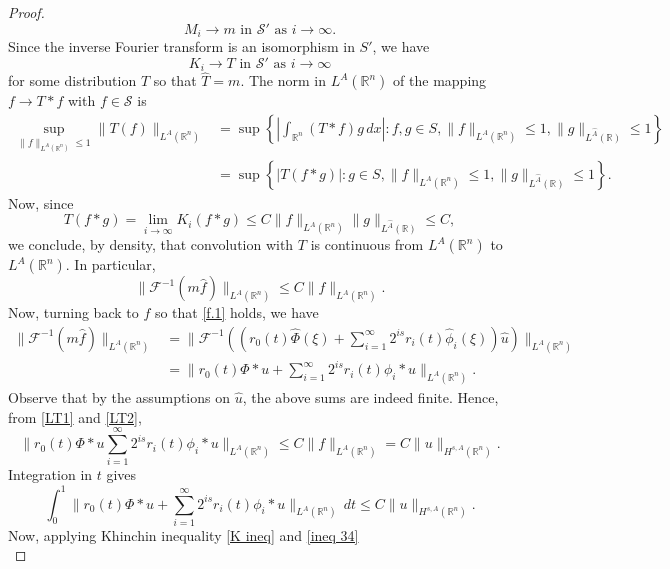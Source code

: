 \documentclass[leqno,twoside, 12pt]{amsart}
\theoremstyle{plain}
\numberwithin{equation}{section} \numberwithin{figure}{section}
\theoremstyle{definition}
\newcommand{\R}{\mathbb R}
\numberwithin{equation}{section}
\begin{document}
\begin{proof}
$$M_i \to m \text{ in }\mathcal{S}' \text{ as }i\to \infty.$$Since the inverse Fourier transform is an isomorphism in $S'$, we have
$$K_i \to T\text{ in $\mathcal{S}'$ as }i\to \infty$$for some distribution $T$ so that $\hat T=m$. The norm in $L^A(\R^n)$ of the mapping $f \to T* f$ with $f\in \mathcal{S}$ is
\begin{equation*}
\begin{split}
\sup_{\|f\|_{L^A(\R^n)}\leq 1}\|T(f)\|_{L^A(\R^n)} &= \sup\left\lbrace \left|\int_{\R^n}(T*f)g \,dx\right|: f, g\in S,\|f\|_{L^A(\R^n)}\leq 1, \|g\|_{L^{\hat A}(\R)}\leq 1 \right\rbrace\\& =\sup\left\lbrace \left|T(f*g)\right|: g\in S,\|f\|_{L^A(\R^n)}\leq 1, \|g\|_{L^{\hat A}(\R)}\leq 1 \right\rbrace.
\end{split}
\end{equation*}Now, since
$$T(f*g)=\lim_{i\to \infty}K_i(f*g)\leq C\|f\|_{L^A(\R^n)}\|g\|_{L^{\hat A}(\R)}\leq C,$$we conclude, by density, that convolution with $T$ is continuous from $L^A(\R^n)$ to $L^A(\R^n)$. In particular,
\begin{equation}\label{LT1}
\|\mathcal{F}^{-1}(m\hat{f})\|_{L^A(\R^n)}\leq C\|f\|_{L^A(\R^n)}.
\end{equation}Now, turning back to $f$ so that \eqref{f.1} holds, we have
\begin{equation}\label{LT2}
\begin{split}
\|\mathcal{F}^{-1}(m\hat{f})\|_{L^A(\R^n)}&=\bigg\|\mathcal{F}^{-1}\left(\left(r_0(t)\hat \Phi(\xi)+\sum_{i=1}^\infty 2^{is}r_i(t)\hat \phi_i(\xi)\right)\hat{u}\right)\bigg\|_{L^A(\R^n)}\\ & = \bigg\| r_0(t)\Phi*u+\sum_{i=1}^\infty 2^{is}r_i(t)\phi_i*u\bigg\|_{L^A(\R^n)}.
\end{split}
\end{equation}Observe that by the assumptions on $\hat u$, the above sums are indeed finite. Hence, from \eqref{LT1} and \eqref{LT2},
\begin{equation}\label{ineq norms}
\bigg\| r_0(t)\Phi*u\sum_{i=1}^\infty 2^{is}r_i(t)\phi_i*u\bigg\|_{L^A(\R^n)} \leq C\|f\|_{L^A(\R^n)} = C\|u\|_{H^{s, A}(\R^n)}.
\end{equation}Integration in $t$ gives
\begin{equation}\label{ineq 34}
\int_{0}^1\bigg\| r_0(t)\Phi*u+\sum_{i=1}^\infty 2^{is}r_i(t)\phi_i*u\bigg\|_{L^A(\R^n)}\,dt \leq  C\|u\|_{H^{s, A}(\R^n)}.
\end{equation}Now, applying Khinchin inequality \eqref{K ineq} and \eqref{ineq 34}
\begin{equation}\label{end first part}

\end{equation}
\end{proof}
\end{document}
